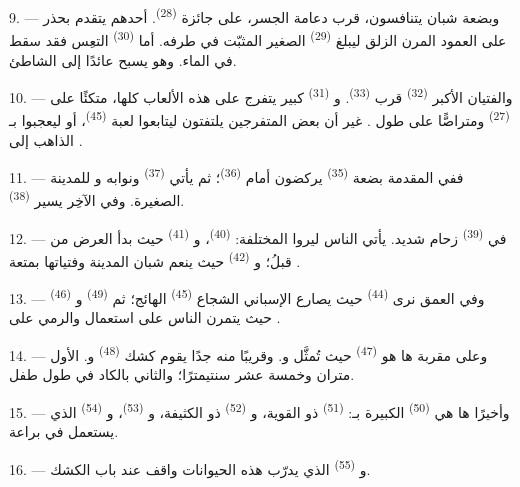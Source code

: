 9. --- وبضعة شبان يتنافسون، قرب دعامة الجسر، على جائزة  \textsuperscript{(28)}. أحدهم يتقدم بحذر على العمود المرن الزلق ليبلغ
 \textsuperscript{(29)} الصغير المثبّت في طرفه. أما
 \textsuperscript{(30)} التعِس فقد سقط في الماء. وهو يسبح عائدًا
إلى الشاطئ.

10. --- والفتيان الأكبر  \textsuperscript{(32)} قرب
 \textsuperscript{(33)}. و \textsuperscript{(31)} كبير
يتفرج على هذه الألعاب كلها، متكئًا على  
\textsuperscript{(27)} ومتراصًّا على طول . غير أن بعض المتفرجين
يلتفتون ليتابعوا لعبة  \textsuperscript{(45)}، أو
ليعجبوا بـ الذاهب إلى .

11. --- ففي المقدمة بضعة  \textsuperscript{(35)} يركضون أمام
 \textsuperscript{(36)}؛ ثم يأتي 
\textsuperscript{(37)} ونوابه و للمدينة الصغيرة. وفي
الآخِر يسير  \textsuperscript{(38)}.

\VUsaut{5.0mm}
\VUsaut{3.6mm}

12. --- في  \textsuperscript{(39)} زحام شديد. يأتي الناس
ليروا  المختلفة:  \textsuperscript{(40)}،
و \textsuperscript{(41)} حيث بدأ العرض من قبلُ؛ و \textsuperscript{(42)} حيث ينعم شبان المدينة وفتياتها بمتعة
.

13. --- وفي العمق نرى  \textsuperscript{(44)} حيث يصارع
 الإسباني الشجاع  \textsuperscript{(45)} الهائج؛
ثم  \textsuperscript{(49)} و
\textsuperscript{(46)} حيث يتمرن الناس على استعمال 
والرمي على .

14. --- وعلى مقربة ها هو  \textsuperscript{(47)} حيث تُمثَّل
 و. وقريبًا منه جدًا يقوم كشك
 \textsuperscript{(48)} و.  الأول
متران وخمسة عشر سنتيمترًا؛ والثاني بالكاد في طول طفل.

15. --- وأخيرًا ها هي  \textsuperscript{(50)} الكبيرة
بـ:  \textsuperscript{(51)} ذو 
القوية، و \textsuperscript{(52)} ذو  الكثيفة،
و \textsuperscript{(53)}، و \textsuperscript{(54)} الذي
يستعمل  في براعة.

16. --- و \textsuperscript{(55)} الذي يدرّب هذه الحيوانات واقف
عند باب الكشك.
\VUsaut{6.0mm}
\VUfilet{22mm}
